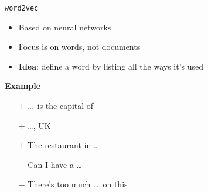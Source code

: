 \begin{frame}{\texttt{word2vec}}
    \begin{itemize}
        \item Based on neural networks
        \item Focus is on words, not documents
        \item \textbf{Idea}: define a word by listing all the ways it's used
    \end{itemize}
    \vfill\pause
    \textbf{Example}\vspace{-0.5em}
    \begin{itemize}
        \item[$+$] \ldots~is the capital of
        \item[$+$] \ldots, UK
        \item[$+$] The restaurant in \ldots
        \item[$-$] Can I have a \ldots
        \item[$-$] There's too much \ldots~on this
    \end{itemize}
\end{frame}




